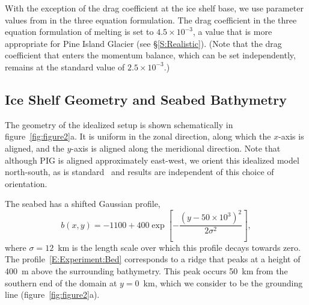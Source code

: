 \documentclass[draft]{agujournal2019}
\begin{document}
With the exception of the drag coefficient at the ice shelf base, we use parameter values from  in the three equation formulation. The drag coefficient in the three equation formulation of melting is set to $4.5\times10^{-3}$, a value that is more appropriate for Pine Island Glacier (see \S\ref{S:Realistic}). (Note that the drag coefficient that enters the momentum balance, which can be set independently, remains at the standard value of $2.5\times 10^{-3}$.)


\subsection{Ice Shelf Geometry and Seabed Bathymetry}\label{S:Experiment:Geometry}
The geometry of the idealized setup is shown schematically in figure~\ref{fig:figure2}a. It is uniform in the zonal direction, along which the $x$-axis is aligned, and the $y$-axis is aligned along the meridional direction. Note that although PIG is aligned approximately east-west, we orient this idealized model north-south, as is standard~\cite{Grosfeld1997JGROceans, DeRydt2014JGeophysResOceans} and results are independent of this choice of orientation.

The seabed has a shifted Gaussian profile,
\begin{equation}\label{E:Experiment:Bed}
    b(x,y) = -1100 + 400 \exp\left[-\frac{\left(y - 50\times 10^3\right)^2}{2\sigma^2}\right],
\end{equation}
where $\sigma = 12$~km is the length scale over which this profile decays towards zero. The profile~\eqref{E:Experiment:Bed} corresponds to a ridge that peaks at a height of 400~m above the surrounding bathymetry. This peak occurs 50 km from the southern end of the domain at $y=0$~km, which we consider to be the grounding line (figure~\ref{fig:figure2}a).
\end{document}
